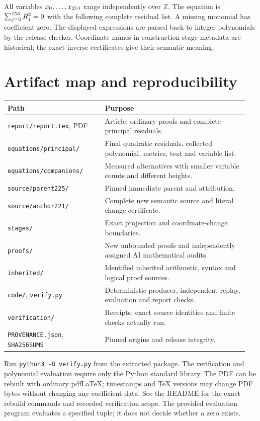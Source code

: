 \documentclass[11pt]{article}
\theoremstyle{definition}\newtheorem{remark}[theorem]{Remark}
\newcommand{\Z}{\mathbb Z}\newcommand{\N}{\mathbb N}\newcommand{\Q}{\mathbb Q}
\begin{document}
All variables $x_0,\ldots,x_{214}$ range independently over $\Z$.
The equation is $\sum_{j=0}^{153}R_j^2=0$ with the following
complete residual list. A missing monomial has coefficient zero.
The displayed expressions are parsed back to integer polynomials by
the release checker. Coordinate names in construction-stage metadata
are historical; the exact inverse certificates give their semantic meaning.



\section{Artifact map and reproducibility}

\begin{longtable}{@{}p{0.38\linewidth}p{0.57\linewidth}@{}}
\toprule Path & Purpose\\\midrule\endhead
\nolinkurl{report/report.tex}, PDF & Article, ordinary proofs and complete principal residuals.\\
\nolinkurl{equations/principal/} & Final quadratic residuals, collected polynomial, metrics, text and variable list.\\
\nolinkurl{equations/companions/} & Measured alternatives with smaller variable counts and different heights.\\
\nolinkurl{source/parent225/} & Pinned immediate parent and attribution.\\
\nolinkurl{source/anchor221/} & Complete new semantic source and literal change certificate.\\
\nolinkurl{stages/} & Exact projection and coordinate-change boundaries.\\
\nolinkurl{proofs/} & New unbounded proofs and independently assigned AI mathematical audits.\\
\nolinkurl{inherited/} & Identified inherited arithmetic, syntax and logical proof sources.\\
\nolinkurl{code/}, \nolinkurl{verify.py} & Deterministic producer, independent replay, evaluation and report checks.\\
\nolinkurl{verification/} & Receipts, exact source identities and finite checks actually run.\\
\nolinkurl{PROVENANCE.json}, \nolinkurl{SHA256SUMS} & Pinned origins and release integrity.\\
\bottomrule
\end{longtable}

Run \texttt{python3 -B verify.py} from the extracted package. The
verification and polynomial evaluation require only the Python standard
library. The PDF can be rebuilt with ordinary pdfLaTeX; timestamps and
TeX versions may change PDF bytes without changing any coefficient data.
See the README for the exact rebuild commands and recorded verification
scope. The provided evaluation program evaluates a specified tuple; it
does not decide whether a zero exists.
\end{document}
